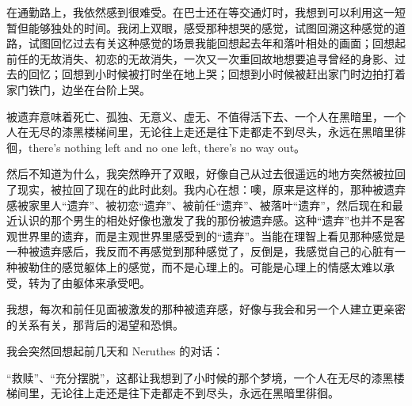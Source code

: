 在通勤路上，我依然感到很难受。在巴士还在等交通灯时，我想到可以利用这一短暂但能够独处的时间。我闭上双眼，感受那种想哭的感觉，试图回溯这种感觉的道路，试图回忆过去有关这种感觉的场景\pozhehao{}我能回想起去年和落叶相处的画面；回想起前任的无故消失、初恋的无故消失，一次又一次重回故地想要追寻曾经的身影、过去的回忆；回想到小时候被打时坐在地上哭；回想到小时候被赶出家门时边拍打着家门铁门，边坐在台阶上哭。

被遗弃意味着死亡、孤独、无意义、虚无、不值得活下去、一个人在黑暗里，一个人在无尽的漆黑楼梯间里，无论往上走还是往下走都走不到尽头，永远在黑暗里徘徊，there's nothing left and no one left, there's no way out。

然后不知道为什么，我突然睁开了双眼，好像自己从过去很遥远的地方突然被拉回了现实，被拉回了现在的此时此刻。我内心在想：噢，原来是这样的，那种被遗弃感\pozhehao{}被家里人“遗弃”、被初恋“遗弃”、被前任“遗弃”、被落叶“遗弃”，然后现在和最近认识的那个男生的相处好像也激发了我的那份被遗弃感。这种“遗弃”也并不是客观世界里的遗弃，而是主观世界里感受到的“遗弃”。当能在理智上看见那种感觉是一种被遗弃感后，我反而不再感觉到那种感觉了，反倒是，我感觉自己的心脏有一种被勒住的感觉\pozhehao{}躯体上的感觉，而不是心理上的。可能是心理上的情感太难以承受，转为了由躯体来承受吧。

我想，每次和前任见面被激发的那种被遗弃感，好像与我会和另一个人建立更亲密的关系有关，那背后的渴望和恐惧。

我会突然回想起前几天和 Neruthes 的对话：


“救赎”、“充分摆脱”，这都让我想到了小时候的那个梦境，一个人在无尽的漆黑楼梯间里，无论往上走还是往下走都走不到尽头，永远在黑暗里徘徊。

